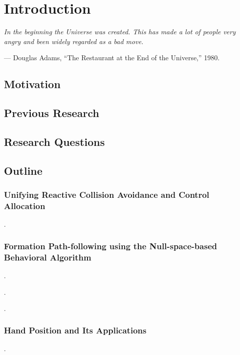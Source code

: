 \chapter{Introduction}
\label{chap:introduction}

\setlength{\epigraphwidth}{0.5\textwidth}
\epigraph{ \it
    In the beginning the Universe was created.
    This has made a lot of people very angry and been widely regarded as a bad move.
}{--- Douglas Adams, ``The Restaurant at the End of the Universe,'' 1980.}

\section{Motivation}

\section{Previous Research}

\section{Research Questions}

\section{Outline}

\subsection{Unifying Reactive Collision Avoidance and Control Allocation}
.

\subsection{Formation Path-following using the Null-space-based Behavioral Algorithm}
.

\noindent{}.

\noindent{}.

\subsection{Hand Position and Its Applications}
.

\noindent{}

\noindent{}

\noindent{}

\noindent{}
